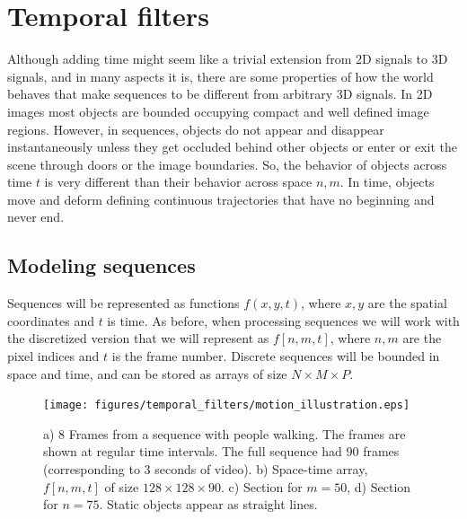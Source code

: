 

\chapter{Temporal filters}
\label{chapter:temporal_filters}



Although adding time might seem like a trivial extension from 2D signals to 3D signals, and in many aspects it is, there are some properties of how the world behaves that make sequences to be different from arbitrary 3D signals. In 2D images most objects are bounded occupying compact and well defined image regions. However, in sequences, objects do not appear and disappear instantaneously unless they get occluded behind other objects or enter or exit the scene through doors or the image boundaries. So, the behavior of objects across time $t$ is very different than their behavior across space $n,m$. In time, objects move and deform defining continuous trajectories that have no beginning and never end. 



\section{Modeling sequences}
\label{sect:modelingSequences}

Sequences will be represented as functions $f (x,y,t)$, where $x,y$ are the spatial coordinates and $t$ is time. As before, when processing sequences we will work with the discretized version that we will represent as $f \left[n,m,t \right]$, where $n,m$ are the pixel indices and $t$ is the frame number. Discrete sequences will be bounded in space and time, and can be stored as arrays of size $N \times M \times P$.


\begin{figure}
\texttt{[image: figures/temporal\_filters/motion\_illustration.eps]}
\caption{a) 8 Frames from a sequence with people walking. The frames are shown at regular time intervals. The full sequence had 90 frames (corresponding to 3 seconds of video). b) Space-time array, $f \left[n,m,t \right]$ of size $128 \times 128 \times 90$. c) Section for $m=50$, d) Section for $n=75$. Static objects appear as straight lines.} 
\label{fig:motion}
\end{figure}

